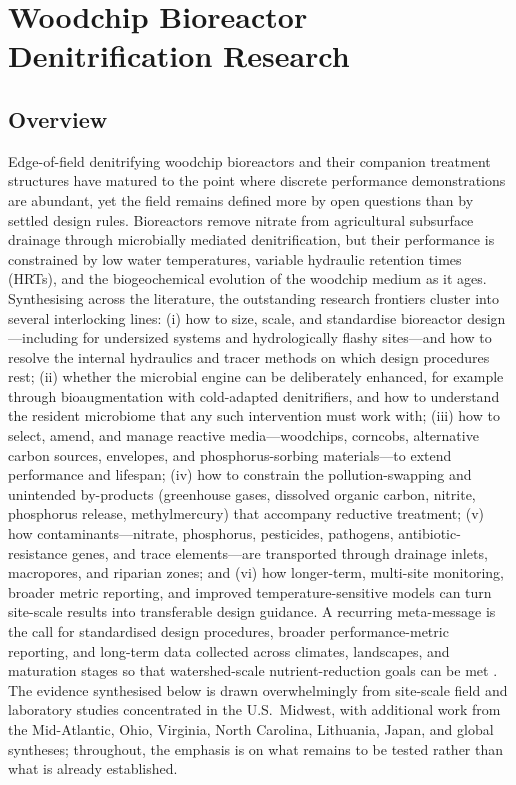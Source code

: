 \documentclass[11pt]{article}
\begin{document}
\section*{Woodchip Bioreactor Denitrification Research}

\subsection{Overview}
Edge-of-field denitrifying woodchip bioreactors and their companion treatment structures have matured to the point where discrete performance demonstrations are abundant, yet the field remains defined more by open questions than by settled design rules. Bioreactors remove nitrate from agricultural subsurface drainage through microbially mediated denitrification, but their performance is constrained by low water temperatures, variable hydraulic retention times (HRTs), and the biogeochemical evolution of the woodchip medium as it ages. Synthesising across the literature, the outstanding research frontiers cluster into several interlocking lines: (i) how to size, scale, and standardise bioreactor design---including for undersized systems and hydrologically flashy sites---and how to resolve the internal hydraulics and tracer methods on which design procedures rest; (ii) whether the microbial engine can be deliberately enhanced, for example through bioaugmentation with cold-adapted denitrifiers, and how to understand the resident microbiome that any such intervention must work with; (iii) how to select, amend, and manage reactive media---woodchips, corncobs, alternative carbon sources, envelopes, and phosphorus-sorbing materials---to extend performance and lifespan; (iv) how to constrain the pollution-swapping and unintended by-products (greenhouse gases, dissolved organic carbon, nitrite, phosphorus release, methylmercury) that accompany reductive treatment; (v) how contaminants---nitrate, phosphorus, pesticides, pathogens, antibiotic-resistance genes, and trace elements---are transported through drainage inlets, macropores, and riparian zones; and (vi) how longer-term, multi-site monitoring, broader metric reporting, and improved temperature-sensitive models can turn site-scale results into transferable design guidance. A recurring meta-message is the call for standardised design procedures, broader performance-metric reporting, and long-term data collected across climates, landscapes, and maturation stages so that watershed-scale nutrient-reduction goals can be met \parencite{Christianson2021,Maxwell2022,Bell2015}. The evidence synthesised below is drawn overwhelmingly from site-scale field and laboratory studies concentrated in the U.S.\ Midwest, with additional work from the Mid-Atlantic, Ohio, Virginia, North Carolina, Lithuania, Japan, and global syntheses; throughout, the emphasis is on what remains to be tested rather than what is already established.
\end{document}
